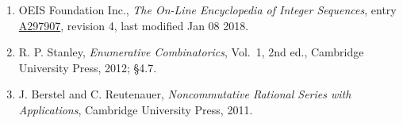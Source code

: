 \documentclass[11pt]{article}
\theoremstyle{definition}
\begin{document}
\begin{enumerate}

\item OEIS Foundation Inc., \emph{The On-Line Encyclopedia of Integer Sequences}, entry \href{https://oeis.org/A297907}{A297907}, revision 4, last modified Jan 08 2018.

\item R. P. Stanley, \emph{Enumerative Combinatorics}, Vol.~1, 2nd ed., Cambridge University Press, 2012; \S4.7.

\item J. Berstel and C. Reutenauer, \emph{Noncommutative Rational Series with Applications}, Cambridge University Press, 2011.

\end{enumerate}
\end{document}
